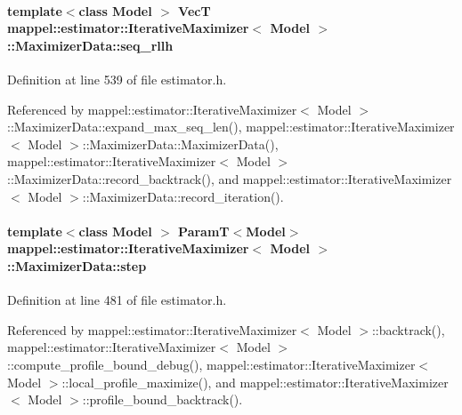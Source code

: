 \paragraph[{\texorpdfstring{seq\+\_\+rllh}{seq_rllh}}]{\setlength{\rightskip}{0pt plus 5cm}template$<$class Model $>$ {\bf VecT} {\bf mappel\+::estimator\+::\+Iterative\+Maximizer}$<$ Model $>$\+::Maximizer\+Data\+::seq\+\_\+rllh\hspace{0.3cm}{\ttfamily [protected]}}\hypertarget{classmappel_1_1estimator_1_1IterativeMaximizer_1_1MaximizerData_ae51783c964589222eb1f88487ba843a1}{}\label{classmappel_1_1estimator_1_1IterativeMaximizer_1_1MaximizerData_ae51783c964589222eb1f88487ba843a1}


Definition at line 539 of file estimator.\+h.



Referenced by mappel\+::estimator\+::\+Iterative\+Maximizer$<$ Model $>$\+::\+Maximizer\+Data\+::expand\+\_\+max\+\_\+seq\+\_\+len(), mappel\+::estimator\+::\+Iterative\+Maximizer$<$ Model $>$\+::\+Maximizer\+Data\+::\+Maximizer\+Data(), mappel\+::estimator\+::\+Iterative\+Maximizer$<$ Model $>$\+::\+Maximizer\+Data\+::record\+\_\+backtrack(), and mappel\+::estimator\+::\+Iterative\+Maximizer$<$ Model $>$\+::\+Maximizer\+Data\+::record\+\_\+iteration().

\paragraph[{\texorpdfstring{step}{step}}]{\setlength{\rightskip}{0pt plus 5cm}template$<$class Model $>$ {\bf ParamT}$<$Model$>$ {\bf mappel\+::estimator\+::\+Iterative\+Maximizer}$<$ Model $>$\+::Maximizer\+Data\+::step}\hypertarget{classmappel_1_1estimator_1_1IterativeMaximizer_1_1MaximizerData_abca4cc72bc3cbf7326c5d4ad040e3821}{}\label{classmappel_1_1estimator_1_1IterativeMaximizer_1_1MaximizerData_abca4cc72bc3cbf7326c5d4ad040e3821}


Definition at line 481 of file estimator.\+h.



Referenced by mappel\+::estimator\+::\+Iterative\+Maximizer$<$ Model $>$\+::backtrack(), mappel\+::estimator\+::\+Iterative\+Maximizer$<$ Model $>$\+::compute\+\_\+profile\+\_\+bound\+\_\+debug(), mappel\+::estimator\+::\+Iterative\+Maximizer$<$ Model $>$\+::local\+\_\+profile\+\_\+maximize(), and mappel\+::estimator\+::\+Iterative\+Maximizer$<$ Model $>$\+::profile\+\_\+bound\+\_\+backtrack().

